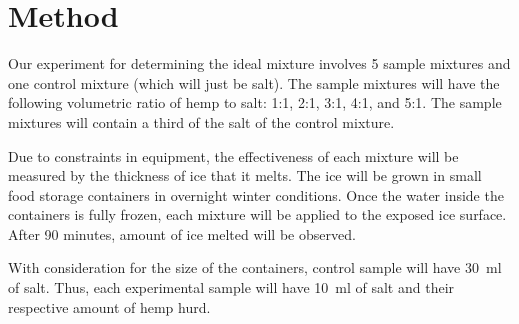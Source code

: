 \section*{Method}

Our experiment for determining the ideal mixture involves 5 sample mixtures and one control mixture (which will just be salt).
The sample mixtures will have the following volumetric ratio of hemp to salt: 1:1, 2:1, 3:1, 4:1, and 5:1.
The sample mixtures will contain a third of the salt of the control mixture.

Due to constraints in equipment, the effectiveness of each mixture will be measured by the thickness of ice that it melts.
The ice will be grown in small food storage containers in overnight winter conditions.
Once the water inside the containers is fully frozen, each mixture will be applied to the exposed ice surface. After 90 minutes, amount of ice melted will be observed.

With consideration for the size of the containers, control sample will have \SI{30}{\ml} of salt.
Thus, each experimental sample will have \SI{10}{\ml} of salt and their respective amount of hemp hurd.